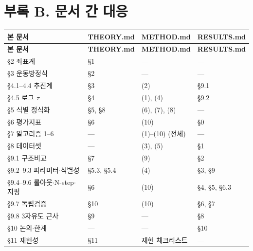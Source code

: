 \documentclass[10pt,a4paper]{article}
\begin{document}
\section*{부록 B. 문서 간 대응}

{\footnotesize\setlength{\tabcolsep}{3pt}
\begin{longtable}{@{}llll@{}}
\toprule
\textbf{본 문서} & \textbf{THEORY.md} & \textbf{METHOD.md} & \textbf{RESULTS.md} \\
\midrule
\endfirsthead
\toprule
\textbf{본 문서} & \textbf{THEORY.md} & \textbf{METHOD.md} & \textbf{RESULTS.md} \\
\midrule
\endhead
\bottomrule
\endlastfoot
\S{}2 좌표계 & \S{}1 & --- & --- \\
\S{}3 운동방정식 & \S{}2 & --- & --- \\
\S{}4.1--4.4 추진계 & \S{}3 & (2) & \S{}9.1 \\
\S{}4.5 로그 $\tau$ & \S{}4 & (1), (4) & \S{}9.2 \\
\S{}5 식별 정식화 & \S{}5, \S{}8 & (6), (7), (8) & --- \\
\S{}6 평가지표 & \S{}6 & (10) & \S{}0 \\
\S{}7 알고리즘 1--6 & --- & (1)--(10) (전체) & --- \\
\S{}8 데이터셋 & --- & (3), (5) & \S{}1 \\
\S{}9.1 구조비교 & \S{}7 & (9) & \S{}2 \\
\S{}9.2--9.3 파라미터$\cdot$식별성 & \S{}5.3, \S{}5.4 & (4) & \S{}3, \S{}9 \\
\S{}9.4--9.6 롤아웃$\cdot$N-step$\cdot$지평 & \S{}6 & (10) & \S{}4, \S{}5, \S{}6.3 \\
\S{}9.7 독립검증 & \S{}10 & (10) & \S{}6, \S{}7 \\
\S{}9.8 3자유도 근사 & \S{}9 & --- & \S{}8 \\
\S{}10 논의$\cdot$한계 & --- & --- & \S{}10 \\
\S{}11 재현성 & \S{}11 & 재현 체크리스트 & --- \\
\end{longtable}}
\end{document}
